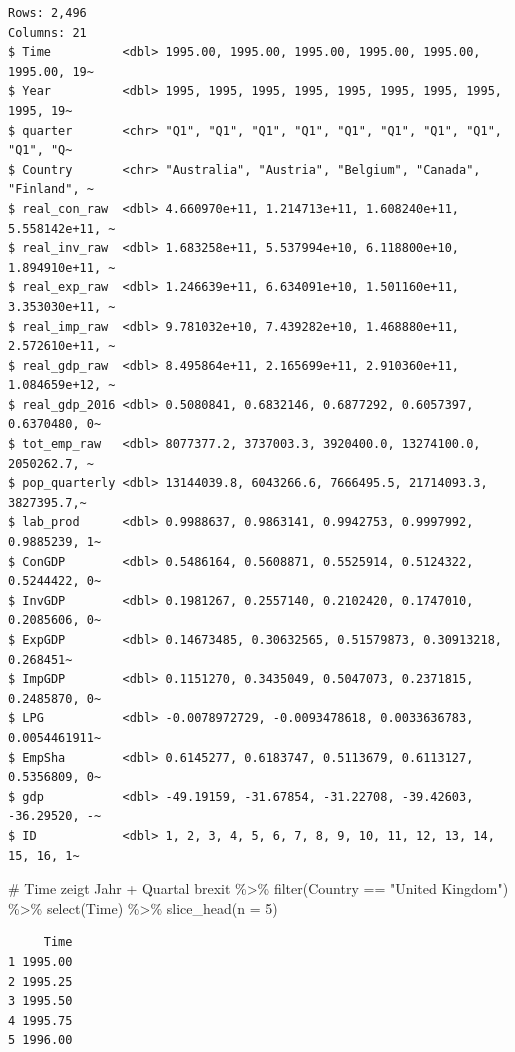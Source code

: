 \documentclass[
  a4paper,
  DIV=11,
  oneside]{scrreprt}
\newenvironment{Shaded}{\begin{snugshade}}{\end{snugshade}}
\newcommand{\AttributeTok}[1]{\textcolor[rgb]{0.40,0.45,0.13}{#1}}
\newcommand{\CommentTok}[1]{\textcolor[rgb]{0.37,0.37,0.37}{#1}}
\newcommand{\DecValTok}[1]{\textcolor[rgb]{0.68,0.00,0.00}{#1}}
\newcommand{\FunctionTok}[1]{\textcolor[rgb]{0.28,0.35,0.67}{#1}}
\newcommand{\NormalTok}[1]{\textcolor[rgb]{0.00,0.23,0.31}{#1}}
\newcommand{\SpecialCharTok}[1]{\textcolor[rgb]{0.37,0.37,0.37}{#1}}
\newcommand{\StringTok}[1]{\textcolor[rgb]{0.13,0.47,0.30}{#1}}
\begin{document}
\begin{verbatim}
Rows: 2,496
Columns: 21
$ Time          <dbl> 1995.00, 1995.00, 1995.00, 1995.00, 1995.00, 1995.00, 19~
$ Year          <dbl> 1995, 1995, 1995, 1995, 1995, 1995, 1995, 1995, 1995, 19~
$ quarter       <chr> "Q1", "Q1", "Q1", "Q1", "Q1", "Q1", "Q1", "Q1", "Q1", "Q~
$ Country       <chr> "Australia", "Austria", "Belgium", "Canada", "Finland", ~
$ real_con_raw  <dbl> 4.660970e+11, 1.214713e+11, 1.608240e+11, 5.558142e+11, ~
$ real_inv_raw  <dbl> 1.683258e+11, 5.537994e+10, 6.118800e+10, 1.894910e+11, ~
$ real_exp_raw  <dbl> 1.246639e+11, 6.634091e+10, 1.501160e+11, 3.353030e+11, ~
$ real_imp_raw  <dbl> 9.781032e+10, 7.439282e+10, 1.468880e+11, 2.572610e+11, ~
$ real_gdp_raw  <dbl> 8.495864e+11, 2.165699e+11, 2.910360e+11, 1.084659e+12, ~
$ real_gdp_2016 <dbl> 0.5080841, 0.6832146, 0.6877292, 0.6057397, 0.6370480, 0~
$ tot_emp_raw   <dbl> 8077377.2, 3737003.3, 3920400.0, 13274100.0, 2050262.7, ~
$ pop_quarterly <dbl> 13144039.8, 6043266.6, 7666495.5, 21714093.3, 3827395.7,~
$ lab_prod      <dbl> 0.9988637, 0.9863141, 0.9942753, 0.9997992, 0.9885239, 1~
$ ConGDP        <dbl> 0.5486164, 0.5608871, 0.5525914, 0.5124322, 0.5244422, 0~
$ InvGDP        <dbl> 0.1981267, 0.2557140, 0.2102420, 0.1747010, 0.2085606, 0~
$ ExpGDP        <dbl> 0.14673485, 0.30632565, 0.51579873, 0.30913218, 0.268451~
$ ImpGDP        <dbl> 0.1151270, 0.3435049, 0.5047073, 0.2371815, 0.2485870, 0~
$ LPG           <dbl> -0.0078972729, -0.0093478618, 0.0033636783, 0.0054461911~
$ EmpSha        <dbl> 0.6145277, 0.6183747, 0.5113679, 0.6113127, 0.5356809, 0~
$ gdp           <dbl> -49.19159, -31.67854, -31.22708, -39.42603, -36.29520, -~
$ ID            <dbl> 1, 2, 3, 4, 5, 6, 7, 8, 9, 10, 11, 12, 13, 14, 15, 16, 1~
\end{verbatim}

\begin{Shaded}
\begin{Highlighting}[]
\CommentTok{\# \textquotesingle{}Time\textquotesingle{} zeigt Jahr + Quartal}
\NormalTok{brexit }\SpecialCharTok{\%\textgreater{}\%} 
  \FunctionTok{filter}\NormalTok{(Country }\SpecialCharTok{==} \StringTok{"United Kingdom"}\NormalTok{) }\SpecialCharTok{\%\textgreater{}\%} 
  \FunctionTok{select}\NormalTok{(Time) }\SpecialCharTok{\%\textgreater{}\%}
  \FunctionTok{slice\_head}\NormalTok{(}\AttributeTok{n =} \DecValTok{5}\NormalTok{)}
\end{Highlighting}
\end{Shaded}

\begin{verbatim}
     Time
1 1995.00
2 1995.25
3 1995.50
4 1995.75
5 1996.00
\end{verbatim}
\end{document}
